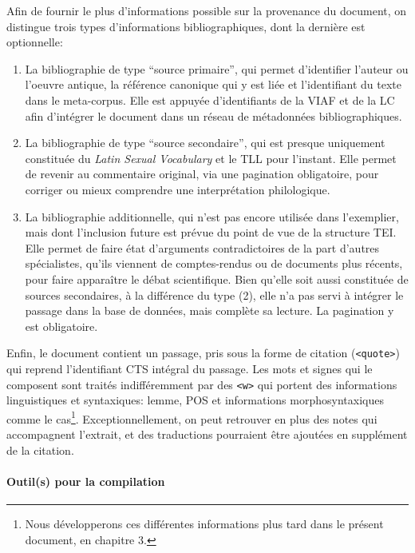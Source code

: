 Afin de fournir le plus d'informations possible sur la provenance du document, on distingue trois types d'informations bibliographiques, dont la dernière est optionnelle:
\begin{enumerate}
    \item La bibliographie de type \enquote{source primaire}, qui permet d'identifier l'auteur ou l'oeuvre antique, la référence canonique qui y est liée et l'identifiant du texte dans le meta-corpus. Elle est appuyée d'identifiants de la \acrfull{VIAF} et de la \acrfull{LC} afin d'intégrer le document dans un réseau de métadonnées bibliographiques.
    \item La bibliographie de type \enquote{source secondaire}, qui est presque uniquement constituée du \textit{Latin Sexual Vocabulary} et le TLL pour l'instant. Elle permet de revenir au commentaire original, via une pagination obligatoire, pour corriger ou mieux comprendre une interprétation philologique.
    \item La bibliographie additionnelle, qui n'est pas encore utilisée dans l'exemplier, mais dont l'inclusion future est prévue du point de vue de la structure TEI. Elle permet de faire état d'arguments contradictoires de la part d'autres spécialistes, qu'ils viennent de comptes-rendus ou de documents plus récents, pour faire apparaître le débat scientifique. Bien qu'elle soit aussi constituée de sources secondaires, à la différence du type (2), elle n'a pas servi à intégrer le passage dans la base de données, mais complète sa lecture. La pagination y est obligatoire.
\end{enumerate}

Enfin, le document contient un passage, pris sous la forme de citation (\texttt{<quote>}) qui reprend l'identifiant CTS intégral du passage. Les mots et signes qui le composent sont traités indifféremment par des \texttt{<w>} qui portent des informations linguistiques et syntaxiques: lemme, POS et informations morphosyntaxiques comme le cas\footnote{Nous développerons ces différentes informations plus tard dans le présent document, en chapitre 3.}. Exceptionnellement, on peut retrouver en plus des notes qui accompagnent l'extrait, et des traductions pourraient être ajoutées en supplément de la citation.

\paragraph{Outil(s) pour la compilation}

